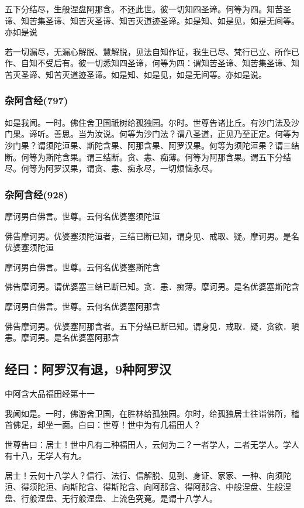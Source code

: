 \documentclass{book}
\begin{document}
五下分结尽，生般涅盘阿那含。不还此世。彼一切知四圣谛。何等为四。知苦圣谛、知苦集圣谛、知苦灭圣谛、知苦灭道迹圣谛。如是知、如是见，如是无间等。亦如是说

若一切漏尽，无漏心解脱、慧解脱，见法自知作证，我生已尽、梵行已立、所作已作、自知不受后有。彼一切悉知四圣谛，何等为四：谓知苦圣谛、知苦集圣谛、知苦灭圣谛、知苦灭道迹圣谛。如是知、如是见，如是无间等。亦如是说。

\subsubsection{杂阿含经(797)}

如是我闻。一时。佛住舍卫国祇树给孤独园。尔时。世尊告诸比丘。有沙门法及沙门果。谛听。善思。当为汝说。何等为沙门法？谓八圣道，正见乃至正定。何等为沙门果？谓须陀洹果、斯陀含果、阿那含果、阿罗汉果。何等为须陀洹果？谓三结断。何等为斯陀含果。谓三结断。贪、恚、痴薄。何等为阿那含果。谓五下分结尽。何等为阿罗汉果，谓贪、恚、痴永尽，一切烦恼永尽。

\subsubsection{杂阿含经(928)}

摩诃男白佛言。世尊。云何名优婆塞须陀洹

佛告摩诃男。优婆塞须陀洹者，三结已断已知，谓身见、戒取、疑。摩诃男。是名优婆塞须陀洹

摩诃男白佛言。世尊。云何名优婆塞斯陀含

佛告摩诃男。谓优婆塞三结已断已知。贪．恚．痴薄。摩诃男。是名优婆塞斯陀含

摩诃男白佛言。世尊。云何名优婆塞阿那含

佛告摩诃男。优婆塞阿那含者。五下分结已断已知。谓身见．戒取．疑．贪欲．瞋恚。摩诃男。是名优婆塞阿那含

\subsection{经曰：阿罗汉有退，9种阿罗汉}

中阿含大品福田经第十一

我闻如是。一时，佛游舍卫国，在胜林给孤独园。尔时，给孤独居士往诣佛所，稽首佛足，却坐一面。白曰：世尊！世中为有几福田人？

世尊告曰：居士！世中凡有二种福田人，云何为二？一者学人，二者无学人。学人有十八，无学人有九。

居士！云何十八学人？信行、法行、信解脱、见到、身证、家家、一种、向须陀洹、得须陀洹、向斯陀含、得斯陀含、向阿那含、得阿那含、中般涅盘、生般涅盘、行般涅盘、无行般涅盘、上流色究竟。是谓十八学人。
\end{document}
